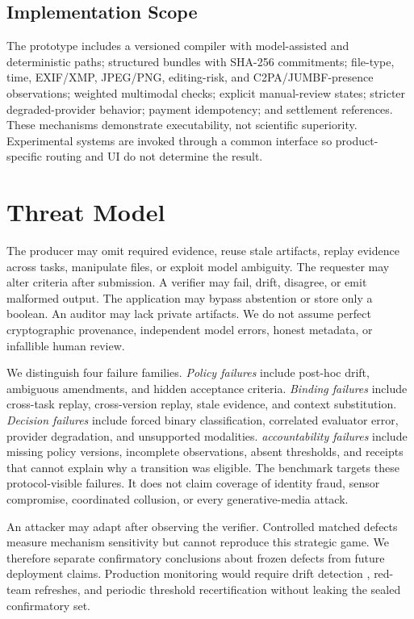 \documentclass[sigconf,anonymous,review]{acmart}
\begin{document}
\subsection{Implementation Scope}
The prototype includes a versioned compiler with model-assisted and deterministic paths; structured bundles with SHA-256 commitments; file-type, time, EXIF/XMP, JPEG/PNG, editing-risk, and C2PA/JUMBF-presence observations; weighted multimodal checks; explicit manual-review states; stricter degraded-provider behavior; payment idempotency; and settlement references. These mechanisms demonstrate executability, not scientific superiority. Experimental systems are invoked through a common interface so product-specific routing and UI do not determine the result.

\section{Threat Model}
The producer may omit required evidence, reuse stale artifacts, replay evidence across tasks, manipulate files, or exploit model ambiguity. The requester may alter criteria after submission. A verifier may fail, drift, disagree, or emit malformed output. The application may bypass abstention or store only a boolean. An auditor may lack private artifacts. We do not assume perfect cryptographic provenance, independent model errors, honest metadata, or infallible human review.

We distinguish four failure families. \emph{Policy failures} include post-hoc drift, ambiguous amendments, and hidden acceptance criteria. \emph{Binding failures} include cross-task replay, cross-version replay, stale evidence, and context substitution. \emph{Decision failures} include forced binary classification, correlated evaluator error, provider degradation, and unsupported modalities. \emph{accountability failures} include missing policy versions, incomplete observations, absent thresholds, and receipts that cannot explain why a transition was eligible. The benchmark targets these protocol-visible failures. It does not claim coverage of identity fraud, sensor compromise, coordinated collusion, or every generative-media attack.

An attacker may adapt after observing the verifier. Controlled matched defects measure mechanism sensitivity but cannot reproduce this strategic game. We therefore separate confirmatory conclusions about frozen defects from future deployment claims. Production monitoring would require drift detection \cite{gama2014survey}, red-team refreshes, and periodic threshold recertification without leaking the sealed confirmatory set.
\end{document}
